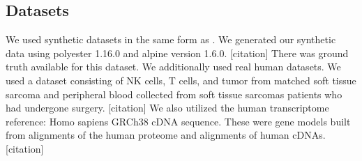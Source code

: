 \subsection{Datasets}
We used synthetic datasets in the same form as \cite{patro_salmon_2017}. 
We generated our synthetic data using polyester 1.16.0 and alpine version 1.6.0. 
[citation] There was ground truth available for this dataset. We additionally used real human datasets. 
We used a dataset consisting of NK cells, T cells, and tumor from matched soft tissue sarcoma and peripheral 
blood collected from soft tissue sarcomas patients who had undergone surgery. 
[citation] We also utilized the human transcriptome reference: Homo sapiens GRCh38 cDNA sequence. 
These were gene models built from alignments of the human proteome and alignments of human cDNAs. [citation]
